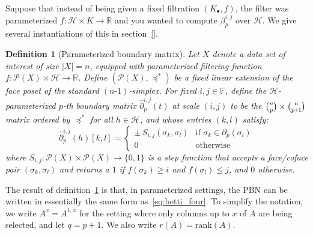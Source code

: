 \documentclass[10pt]{article}
\newcommand{\+}{%
	\raisebox{0.18ex}{\scaleobj{0.55}{+}}
}
\newtheorem{definition}{Definition}
\begin{document}
Suppose that instead of being given a fixed filtration $(K_\bullet, f)$, the filter was parameterized $f : \mathcal{H} \times K \to \mathbb{R}$ and you wanted to compute $\beta_p^{i,j}$ over $\mathcal{H}$. We give several instantiations of this in section~\ref{}.

\begin{definition}[Parameterized boundary matrix]\label{def:time_boundary_matrix}
Let $X$ denote a data set of interest of size $\lvert X \rvert = n$, equipped with parameterized filtering function $f : \mathcal{P}(X) \times \mathcal{H} \to \mathbb{R}$. 
Define $(\mathcal{P}(X), \preceq^\ast)$ be a fixed linear extension of the face poset of the standard $(n\text{-} 1)$-simplex. For fixed $i,j \in \mathbb{F}$, define the $\mathcal{H}$-\emph{parameterized} $p$\emph{-th boundary matrix} $\hat{\partial}_p^{i, j}(t)$ \emph{at scale} $(i,j)$ to be the $\binom{n}{p} \times \binom{n}{p\+1}$ matrix ordered by $\preceq^\ast$ for all $h \in \mathcal{H}$, and whose entries $(k,l)$ satisfy:
\begin{equation}
	\hat{\partial}_p^{i,j}(h)[k,l] = \begin{cases}
	\pm \, S_{i,j}(\sigma_k, \sigma_l) & \text{if } \sigma_k \in \partial_p(\sigma_l) \\
	0 & \text{otherwise}
\end{cases}
\end{equation}
where $S_{i, j} : \mathcal{P}(X) \times \mathcal{P}(X) \to \{0, 1\}$ is a \emph{step} function that accepts a face/coface pair $(\sigma_k, \sigma_l)$ and returns a $1$ if $f(\sigma_k) \geq i$ and $f(\sigma_l) \leq j$, and $0$ otherwise.
\end{definition}
\noindent
The result of definition~\ref{def:time_boundary_matrix} is that, in parameterized settings, the PBN can be written in essentially the same form as~\eqref{eq:betti_four}. To simplify the notation, we write $A^{x} = A^{1,x}$ for the setting where only columns up to $x$ of $A$ are being selected, and let $q = p + 1$. We also write $r(A) = \mathrm{rank}(A)$. 
\end{document}
